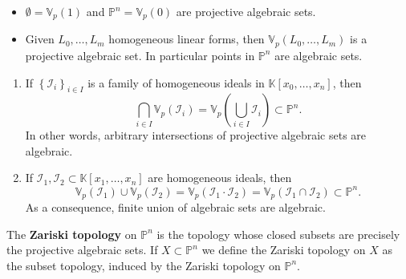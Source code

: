 \begin{ex}\leavevmode\vspace{-.2\baselineskip}
	\begin{itemize}
		\item $\emptyset = \mathbb{V}_p\left( 1 \right)$ and $\mathbb{P}^n = \mathbb{V}_p\left( 0 \right)$ are projective algebraic sets.
		\item Given $L_0, \ldots, L_m$ homogeneous linear forms, then $\mathbb{V}_p\left( L_0, \ldots, L_m \right)$ is a projective algebraic set.
			In particular points in $\mathbb{P}^n$ are algebraic sets.
	\end{itemize}
\end{ex} 

\begin{prop}\leavevmode\vspace{-.2\baselineskip}
	\begin{enumerate}
		\item If $\left\{ \mathcal{I}_i \right\}_{i \in I} $ is a family of homogeneous ideals in $\mathbb{K}\left[x_0, \ldots, x_n \right]$, then
			\begin{equation}
			\bigcap_{i \in I} \mathbb{V}_p\left( \mathcal{I}_i \right) = \mathbb{V}_p\left( \bigcup_{i \in I} \mathcal{I}_i \right) \subset \mathbb{P}^n
			.\end{equation} 
			In other words, arbitrary intersections of projective algebraic sets are algebraic.
		\item If $\mathcal{I}_1, \mathcal{I}_2 \subset \mathbb{K}\left[x_1, \ldots, x_n \right]$ are homogeneous ideals, then
			\begin{equation}
			\mathbb{V}_p\left( \mathcal{I}_1 \right) \cup \mathbb{V}_p\left( \mathcal{I}_2 \right) = \mathbb{V}_p\left( \mathcal{I}_1 \cdot \mathcal{I}_2 \right) = \mathbb{V}_p\left( \mathcal{I}_1 \cap \mathcal{I}_2 \right) \subset \mathbb{P}^n
			.\end{equation} 
			As a consequence, finite union of algebraic sets are algebraic.
	\end{enumerate}
\end{prop} 

\begin{defn}
	The \textbf{Zariski topology} on $\mathbb{P}^n$ is the topology whose closed subsets are precisely the projective algebraic sets.
	If $X \subset \mathbb{P}^n$ we define the Zariski topology on $X$ as the subset topology, induced by the Zariski topology on $\mathbb{P}^n$.
\end{defn}

